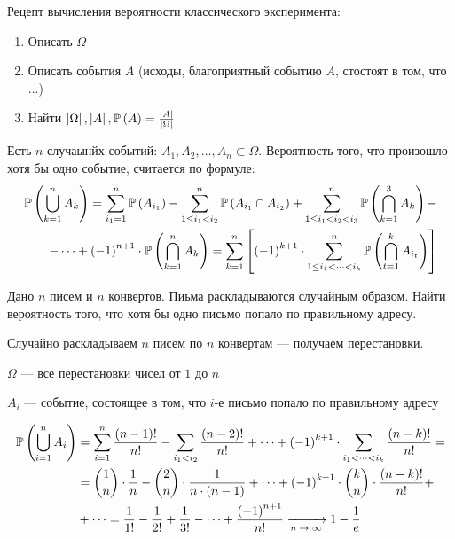 Рецепт вычисления вероятности классического эксперимента:
\begin{enumerate}
\item Описать $\Omega$
\item Описать события $A$ (исходы, благоприятный событию $A$, стостоят в том, что ...)
\item Найти $\left|\Omega\right|, \left|A\right|, \mathbb{P}\left( A \right)=\frac{\left|A\right|}{\left|\Omega\right|}$
\end{enumerate}
\begin{theorem}
Есть $n$ случаынйх событий: $A_1, A_2, \dots, A_n \subset \Omega$. Вероятность того, что произошло хотя бы одно событие, считается по формуле:
\begin{align*}
\mathbb{P}\left( \bigcup_{k=1}^n A_k \right)=
\sum_{i_1=1}^n \mathbb{P}\left( A_{i_1} \right) -
\sum_{1\le i_1<i_2}^n \mathbb{P}\left( A_{i_1} \cap A_{i_2} \right)
+ \sum_{1\le i_1<i_2<i_3}^n \mathbb{P}\left( \bigcap_{k=1}^3 A_k \right) -\\
- \dots +
\left(-1\right)^{n+1} \cdot \mathbb{P}\left( \bigcap_{k=1}^n A_k \right) =
 \sum_{k=1}^n
    \left[ \left(-1\right)^{k+1} \cdot
        \sum_{1\le i_1<\dots<i_k}^n \mathbb{P}\left( \bigcap_{t=1}^k A_{i_t} \right)
    \right]
\end{align*}
\end{theorem}

\begin{example}
Дано $n$ писем и $n$ конвертов. Пиьма раскладываются случайным образом. Найти вероятность того, что хотя бы одно письмо попало по правильному адресу.

Случайно раскладываем $n$ писем по $n$ конвертам --- получаем перестановки.

$\Omega$ --- все перестановки чисел от $1$ до $n$

$A_i$ --- событие, состоящее в том, что $i$-е письмо попало по правильному адресу

\begin{align*}
\mathbb{P}\left( \bigcup_{i=1}^n A_i  \right) &=
\sum_{i=1}^n \frac{\left(n-1\right)!}{n!} -
\sum_{i_1<i_2} \frac{\left(n-2\right)!}{n!} + \dots +
\left(-1\right)^{k+1}\cdot
\sum_{i_1<\dots<i_k} \frac{\left(n-k\right)!}{n!}=\\
&=
\binom{1}{n}\cdot\frac{1}{n}-
\binom{2}{n}\cdot\frac{1}{n\cdot\left(n-1\right)}+\dots+
\left(-1\right)^{k+1} \cdot\binom{k}{n}\cdot\frac{\left(n-k\right)!}{n!}+\\
&+\dots =
\frac{1}{1!}-\frac{1}{2!}+\frac{1}{3!}-\dots+
\frac{\left(-1\right)^{n+1}}{n!} \xrightarrow[\text{$n\to\infty$}]{} 1-\frac{1}{e}
\end{align*}
\end{example}

